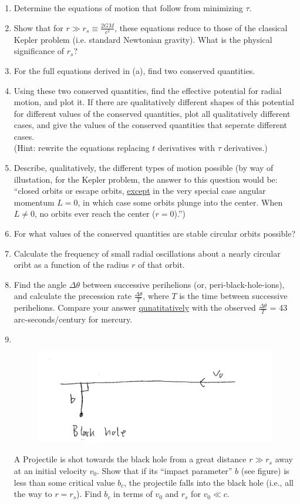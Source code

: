\documentclass[12pt]{article}
\begin{document}
\begin{enumerate}[label=(\alph*)]
    \item Determine the equations of motion that follow from minimizing $\tau$.
    \item Show that for $r \gg r_s\equiv\frac{2GM}{c^2}$, these equations reduce to those of the classical Kepler problem (i.e. standard Newtonian gravity). What is the physical significance of $r_s$?
    \item For the full equations derived in (a), find two conserved quantities.
    \item Using these two conserved quantities, find the effective potential for radial motion, and plot it. If there are qualitatively different shapes of this potential for different values of the conserved quantities, plot all qualitatively different cases, and give the values of the conserved quantities that seperate different cases. \\ (Hint: rewrite the equations replacing $t$ derivatives with $\tau$ derivatives.)  
    \item Describe, qualitatively, the different types of motion possible (by way of illustation, for the Kepler problem, the answer to this question would be: ``closed orbits or escape orbits, \underline{except} in the very special case angular momentum $L=0$, in which case some orbits plunge into the center. When $L\neq 0$, no orbits ever reach the center ($r=0$).'')
    \item For what values of the conserved quantities are stable circular orbits possible?
    \item Calculate the frequency of small radial oscillations about a nearly circular oribt as a function of the radius $r$ of that orbit.
    \item Find the angle $\Delta\theta$ between successive perihelions (or, peri-black-hole-ions), and calculate the precession rate $\frac{\Delta\theta}{T}$, where $T$ is the time between successive perihelions. Compare your answer \underline{qunatitatively} with the observed $\frac{\Delta\theta}{T}$ = 43 arc-seconds/century for mercury.
    \item \[\]
    \begin{figure}[H]
        \includegraphics[scale=1]{Problem1}
        \centering
    \end{figure}
    A Projectile is shot towards the black hole from a great distance $r \gg r_s$ away at an initial velocity $v_0$. Show that if its ``impact parameter'' $b$ (see figure) is less than some critical value $b_c$, the projectile falls into the black hole (i.e., all the way to $r=r_s$). Find $b_c$ in terms of $v_0$ and $r_s$ for $v_0 \ll c$.
\end{enumerate}
\end{document}
